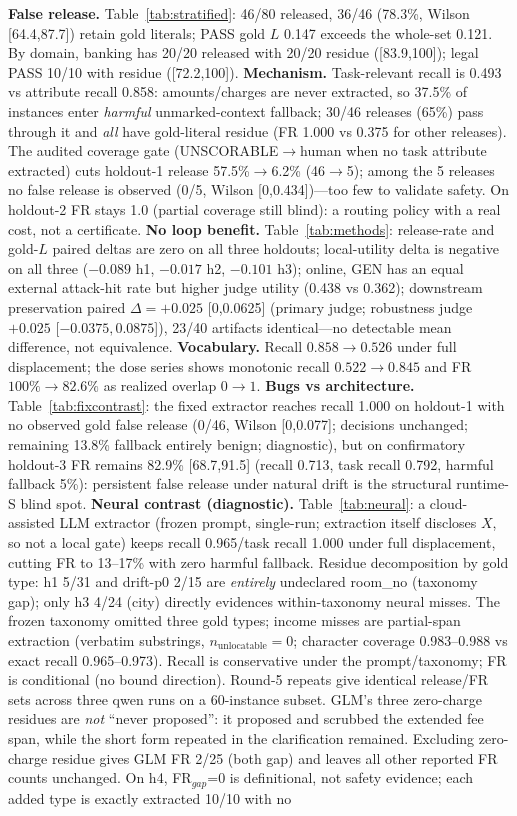 \documentclass[conference]{IEEEtran}
\begin{document}
\textbf{False release.} Table~\ref{tab:stratified}: 46/80 released, 36/46 (78.3\%, Wilson [64.4,87.7]) retain gold literals; PASS gold $L$ 0.147 exceeds the whole-set 0.121. By domain, banking has 20/20 released with 20/20 residue ([83.9,100]); legal PASS 10/10 with residue ([72.2,100]). \textbf{Mechanism.} Task-relevant recall is 0.493 vs attribute recall 0.858: amounts/charges are never extracted, so 37.5\% of instances enter \emph{harmful} unmarked-context fallback; 30/46 releases (65\%) pass through it and \emph{all} have gold-literal residue (FR 1.000 vs 0.375 for other releases). The audited coverage gate (UNSCORABLE$\to$human when no task attribute extracted) cuts holdout-1 release 57.5\%$\to$6.2\% (46$\to$5); among the 5 releases no false release is observed (0/5, Wilson [0,0.434])---too few to validate safety. On holdout-2 FR stays 1.0 (partial coverage still blind): a routing policy with a real cost, not a certificate. \textbf{No loop benefit.} Table~\ref{tab:methods}: release-rate and gold-$L$ paired deltas are zero on all three holdouts; local-utility delta is negative on all three ($-0.089$ h1, $-0.017$ h2, $-0.101$ h3); online, GEN has an equal external attack-hit rate but higher judge utility (0.438 vs 0.362); downstream preservation paired $\Delta=+0.025$ [0,0.0625] (primary judge; robustness judge $+0.025$ [$-0.0375,0.0875$]), 23/40 artifacts identical---no detectable mean difference, not equivalence. \textbf{Vocabulary.} Recall $0.858\to0.526$ under full displacement; the dose series shows monotonic recall $0.522\to0.845$ and FR $100\%\to82.6\%$ as realized overlap $0\to1$. \textbf{Bugs vs architecture.} Table~\ref{tab:fixcontrast}: the fixed extractor reaches recall 1.000 on holdout-1 with no observed gold false release (0/46, Wilson [0,0.077]; decisions unchanged; remaining 13.8\% fallback entirely benign; diagnostic), but on confirmatory holdout-3 FR remains 82.9\% [68.7,91.5] (recall 0.713, task recall 0.792, harmful fallback 5\%): persistent false release under natural drift is the structural runtime-S blind spot. \textbf{Neural contrast (diagnostic).} Table~\ref{tab:neural}: a cloud-assisted LLM extractor (frozen prompt, single-run; extraction itself discloses $X$, so not a local gate) keeps recall 0.965/task recall 1.000 under full displacement, cutting FR to 13--17\% with zero harmful fallback. Residue decomposition by gold type: h1 5/31 and drift-p0 2/15 are \emph{entirely} undeclared room\_no (taxonomy gap); only h3 4/24 (city) directly evidences within-taxonomy neural misses. The frozen taxonomy omitted three gold types; income misses are partial-span extraction (verbatim substrings, $n_{\mathrm{unlocatable}}=0$; character coverage 0.983--0.988 vs exact recall 0.965--0.973). Recall is conservative under the prompt/taxonomy; FR is conditional (no bound direction). Round-5 repeats give identical release/FR sets across three qwen runs on a 60-instance subset. GLM's three zero-charge residues are \emph{not} ``never proposed'': it proposed and scrubbed the extended fee span, while the short form repeated in the clarification remained. Excluding zero-charge residue gives GLM FR 2/25 (both gap) and leaves all other reported FR counts unchanged. On h4, FR$_{gap}$=0 is definitional, not safety evidence; each added type is exactly extracted 10/10 with no 
\end{document}

